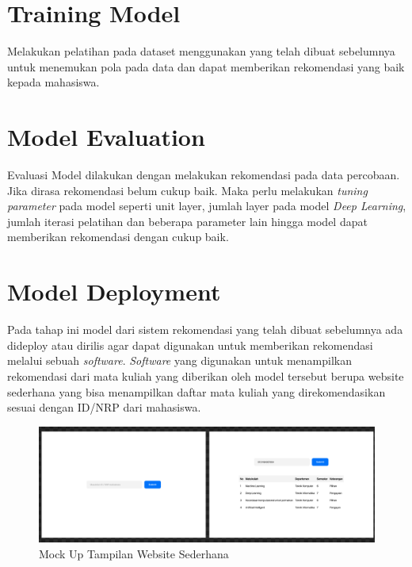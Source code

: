 \section{Training Model}
Melakukan pelatihan pada dataset menggunakan yang telah dibuat sebelumnya untuk menemukan pola pada data dan dapat memberikan rekomendasi yang baik kepada mahasiswa.

\section{Model Evaluation}
Evaluasi Model dilakukan dengan melakukan rekomendasi pada data percobaan. Jika dirasa rekomendasi belum cukup baik. Maka perlu melakukan
\emph{tuning parameter} pada model seperti unit layer, jumlah layer pada model \emph{Deep Learning}, jumlah iterasi pelatihan dan beberapa parameter lain hingga model dapat memberikan rekomendasi dengan cukup baik.

\section{Model Deployment}
Pada tahap ini model dari sistem rekomendasi yang telah dibuat sebelumnya ada dideploy atau dirilis agar dapat digunakan untuk memberikan rekomendasi melalui sebuah \emph{software}.
\emph{Software} yang digunakan untuk menampilkan rekomendasi dari mata kuliah yang diberikan oleh model tersebut berupa website sederhana yang bisa menampilkan daftar mata kuliah
yang direkomendasikan sesuai dengan ID/NRP dari mahasiswa.

\begin{figure} [ht] \centering
  \includegraphics[width=160mm]{gambar/mockup.png}
  \caption{Mock Up Tampilan Website Sederhana}
\end{figure}

